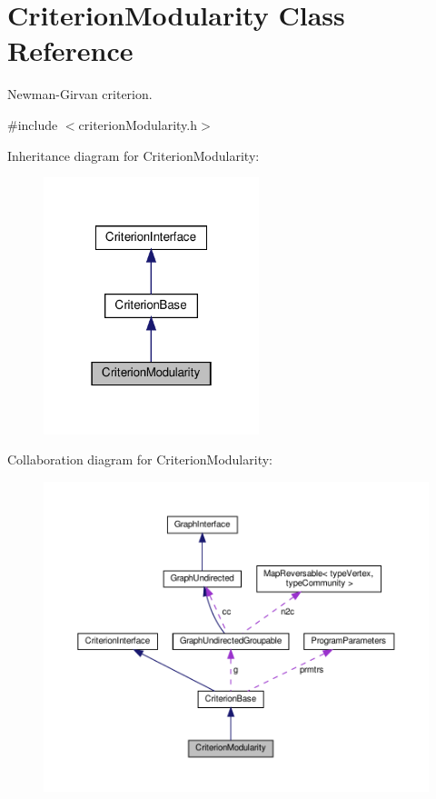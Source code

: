 \hypertarget{classCriterionModularity}{}\section{Criterion\+Modularity Class Reference}
\label{classCriterionModularity}


Newman-\/\+Girvan criterion.  




{\ttfamily \#include $<$criterion\+Modularity.\+h$>$}



Inheritance diagram for Criterion\+Modularity\+:
\nopagebreak
\begin{figure}[H]
\begin{center}
\leavevmode
\includegraphics[width=178pt]{classCriterionModularity__inherit__graph}
\end{center}
\end{figure}


Collaboration diagram for Criterion\+Modularity\+:
\nopagebreak
\begin{figure}[H]
\begin{center}
\leavevmode
\includegraphics[width=350pt]{classCriterionModularity__coll__graph}
\end{center}
\end{figure}

